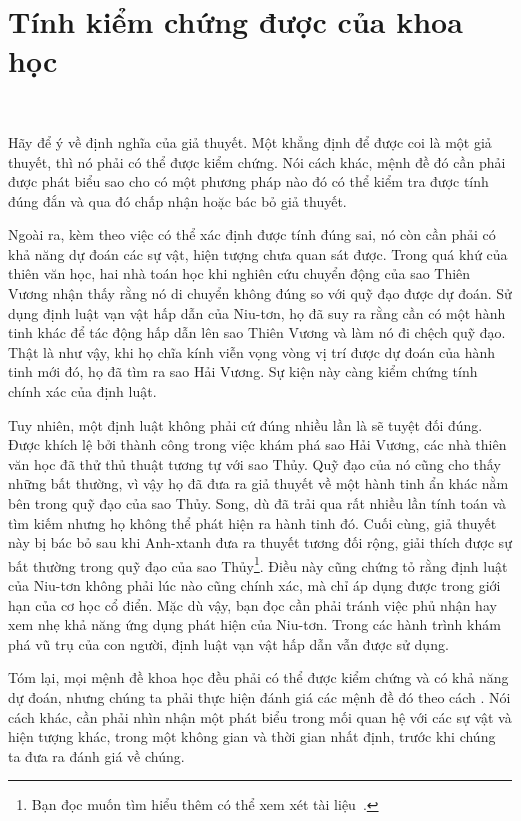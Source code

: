 \section{Tính kiểm chứng được của khoa học}

\

Hãy để ý về định nghĩa của giả thuyết. Một khẳng định để được coi là một giả thuyết, thì nó phải có thể được kiểm chứng. Nói cách khác, mệnh đề đó cần phải được phát biểu sao cho có một phương pháp nào đó có thể kiểm tra được tính đúng đắn và qua đó chấp nhận hoặc bác bỏ giả thuyết.

Ngoài ra, kèm theo việc có thể xác định được tính đúng sai, nó còn cần phải có khả năng dự đoán các sự vật, hiện tượng chưa quan sát được. Trong quá khứ của thiên văn học, hai nhà toán học khi nghiên cứu chuyển động của sao Thiên Vương nhận thấy rằng nó di chuyển không đúng so với quỹ đạo được dự đoán. Sử dụng định luật vạn vật hấp dẫn của Niu-tơn, họ đã suy ra rằng cần có một hành tinh khác để tác động hấp dẫn lên sao Thiên Vương và làm nó đi chệch quỹ đạo. Thật là như vậy, khi họ chĩa kính viễn vọng vòng vị trí được dự đoán của hành tinh mới đó, họ đã tìm ra sao Hải Vương. Sự kiện này càng kiểm chứng tính chính xác của định luật.

Tuy nhiên, một định luật không phải cứ đúng nhiều lần là sẽ tuyệt đối đúng. Được khích lệ bởi thành công trong việc khám phá sao Hải Vương, các nhà thiên văn học đã thử thủ thuật tương tự với sao Thủy. Quỹ đạo của nó cũng cho thấy những bất thường, vì vậy họ đã đưa ra giả thuyết về một hành tinh ẩn khác nằm bên trong quỹ đạo của sao Thủy. Song, dù đã trải qua rất nhiều lần tính toán và tìm kiếm nhưng họ không thể phát hiện ra hành tinh đó. Cuối cùng, giả thuyết này bị bác bỏ sau khi Anh-xtanh đưa ra thuyết tương đối rộng, giải thích được sự bất thường trong quỹ đạo của sao Thủy\footnote{Bạn đọc muốn tìm hiểu thêm có thể xem xét tài liệu~\cite{baum1997search}.}. Điều này cũng chứng tỏ rằng định luật của Niu-tơn không phải lúc nào cũng chính xác, mà chỉ áp dụng được trong giới hạn của cơ học cổ điển. Mặc dù vậy, bạn đọc cần phải tránh việc phủ nhận hay xem nhẹ khả năng ứng dụng phát hiện của Niu-tơn. Trong các hành trình khám phá vũ trụ của con người, định luật vạn vật hấp dẫn vẫn được sử dụng.

Tóm lại, mọi mệnh đề khoa học đều phải có thể được kiểm chứng và có khả năng dự đoán, nhưng chúng ta phải thực hiện đánh giá các mệnh đề đó theo cách . Nói cách khác, cần phải nhìn nhận một phát biểu trong mối quan hệ với các sự vật và hiện tượng khác, trong một không gian và thời gian nhất định, trước khi chúng ta đưa ra đánh giá về chúng.